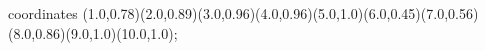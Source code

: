 					coordinates { (1.0,0.78)(2.0,0.89)(3.0,0.96)(4.0,0.96)(5.0,1.0)(6.0,0.45)(7.0,0.56)(8.0,0.86)(9.0,1.0)(10.0,1.0)};